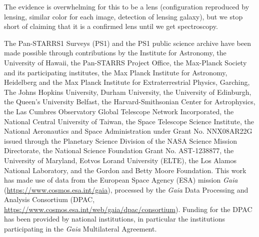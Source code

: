 \documentclass[manuscript]{aastex}
\begin{document}
The evidence is overwhelming for this to be a lens (configuration reproduced by lensing, similar color for each image, detection of lensing galaxy), but we stop short of claiming that it is a confirmed lens until we get spectroscopy.



\acknowledgments

The Pan-STARRS1 Surveys (PS1) and the PS1 public science archive have been made possible through contributions by the Institute for Astronomy, the University of Hawaii, the Pan-STARRS Project Office, the Max-Planck Society and its participating institutes, the Max Planck Institute for Astronomy, Heidelberg and the Max Planck Institute for Extraterrestrial Physics, Garching, The Johns Hopkins University, Durham University, the University of Edinburgh, the Queen's University Belfast, the Harvard-Smithsonian Center for Astrophysics, the Las Cumbres Observatory Global Telescope Network Incorporated, the National Central University of Taiwan, the Space Telescope Science Institute, the National Aeronautics and Space Administration under Grant No. NNX08AR22G issued through the Planetary Science Division of the NASA Science Mission Directorate, the National Science Foundation Grant No. AST-1238877, the University of Maryland, Eotvos Lorand University (ELTE), the Los Alamos National Laboratory, and the Gordon and Betty Moore Foundation.
This work has made use of data from the European Space Agency (ESA)
mission {\it Gaia} (\url{https://www.cosmos.esa.int/gaia}), processed by
the {\it Gaia} Data Processing and Analysis Consortium (DPAC,
\url{https://www.cosmos.esa.int/web/gaia/dpac/consortium}). Funding
for the DPAC has been provided by national institutions, in particular
the institutions participating in the {\it Gaia} Multilateral Agreement.
\end{document}
